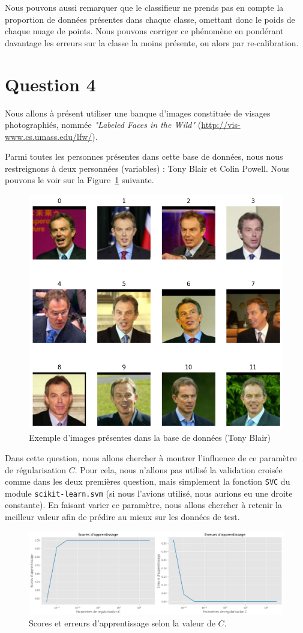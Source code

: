 \documentclass{article}
\begin{document}
Nous pouvons aussi remarquer que le classifieur ne prends pas en compte la proportion de données présentes dans chaque classe, omettant donc le poids de chaque nuage de points. Nous pouvons corriger ce phénomène en pondérant davantage les erreurs sur la classe la moins présente, ou alors par re-calibration.

\section{Question 4}

Nous allons à présent utiliser une banque d'images constituée de visages photographiés, nommée \textit{"Labeled Faces in the Wild"} (\url{http://vis-www.cs.umass.edu/lfw/}).

Parmi toutes les personnes présentes dans cette base de données, nous nous restreignons à deux personnées (variables) : Tony Blair et Colin Powell. Nous pouvons le voir sur la Figure~\ref{fig:q4_gallery} suivante.

\begin{figure}[H]
    \centering
    \includegraphics[width=0.35\linewidth]{outputs/q4_gallery.png}
    \caption{Exemple d'images présentes dans la base de données (Tony Blair)}
    \label{fig:q4_gallery}
\end{figure}

Dans cette question, nous allons chercher à montrer l'influence de ce paramètre de régularisation $C$. Pour cela, nous n'allons pas utilisé la validation croisée comme dans les deux premières question, mais simplement la fonction \texttt{SVC} du module \texttt{scikit-learn.svm} (si nous l'avions utilisé, nous aurions eu une droite constante). En faisant varier ce paramètre, nous allons chercher à retenir la meilleur valeur afin de prédire au mieux sur les données de test.

\begin{figure}[h]
    \centering
    \includegraphics[width=.8\linewidth]{outputs/q4_scores_erreurs.png}
    \caption{Scores et erreurs d'apprentissage selon la valeur de $C$.}
    \label{fig:q4_score_erreur}
\end{figure}
\end{document}
